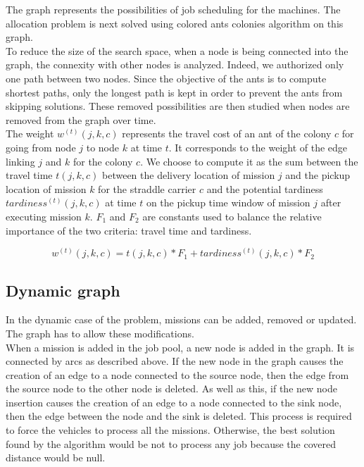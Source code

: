 \documentclass[a4paper,10pt]{article}
\begin{document}
The graph represents the possibilities of job scheduling for the machines. The allocation problem is next solved using colored ants colonies algorithm on this graph.\\

To reduce the size of the search space, when a node is being connected into the graph, the connexity with other nodes is analyzed. Indeed, we authorized only one path between two nodes. Since the objective of the ants is to compute shortest paths, only the longest path is kept in order to prevent the ants from skipping solutions. These removed possibilities are then studied when nodes are removed from the graph over time.\\

The weight $w^{(t)}(j,k,c)$ represents the travel cost of an ant of the colony $c$ for going from node $j$ to node $k$ at time $t$. It corresponds to the weight of the edge linking $j$ and $k$ for the colony $c$. We choose to compute it as the sum between the travel time $t(j,k,c)$ between the delivery location of mission $j$ and the pickup location of mission $k$ for the straddle carrier $c$ and the potential tardiness $tardiness^{(t)}(j,k,c)$ at time $t$ on the pickup time window of mission $j$ after executing mission $k$. $F_1$ and $F_2$ are constants used to balance the relative importance of the two criteria: travel time and tardiness.

\begin{equation*}
  w^{(t)}(j,k,c) = t(j,k,c)*F_1 + tardiness^{(t)}(j,k,c)*F_2
\end{equation*}

\subsection{Dynamic graph}
In the dynamic case of the problem, missions can be added, removed or updated. The graph has to allow these modifications.\\

When a mission is added in the job pool, a new node is added in the graph. It is connected by arcs as described above. If the new node in the graph causes the creation of an edge to a node connected to the source node, then the edge from the source node to the other node is deleted. As well as this, if the new node insertion causes the creation of an edge to a node connected to the sink node, then the edge between the node and the sink is deleted. This process is required to force the vehicles to process all the missions. Otherwise, the best solution found by the algorithm would be not to process any job because the covered distance would be null.
\\
\end{document}
